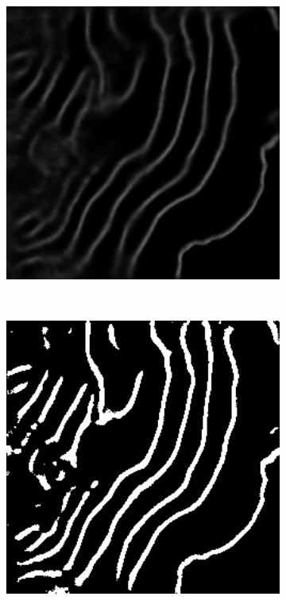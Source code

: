 \begin{figure}[t]
    \centering
    \begin{subfigure}[t]{0.32\textwidth}
        \centering
        \includegraphics[width=1\textwidth, valign=c]{images/skel-pred.png}
    \end{subfigure}
    ~
    \begin{subfigure}[t]{0.32\textwidth}
        \centering
        \includegraphics[width=1\textwidth, valign=c]{images/skel-thresh.png}

\end{subfigure}
\end{figure}
